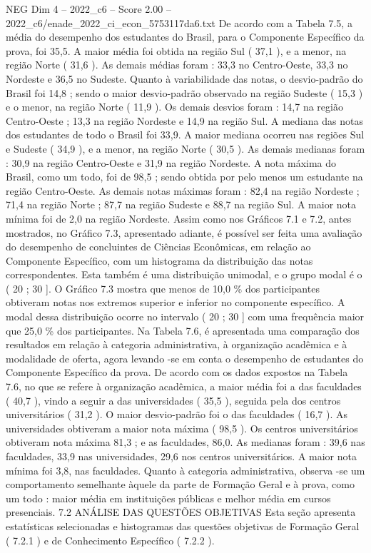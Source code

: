 \begin{textsample}{NEG Dim 4 – 2022\_c6 – Score 2.00 – 2022\_c6/enade\_2022\_ci\_econ\_5753117da6.txt}
De acordo com a Tabela 7.5, a média do desempenho dos estudantes do Brasil, para o Componente Específico da prova, foi 35,5.
A maior média foi obtida na região Sul ( 37,1 ), e a menor, na região Norte ( 31,6 ).
As demais médias foram : 33,3 no Centro-Oeste, 33,3 no Nordeste e 36,5 no Sudeste.
Quanto à variabilidade das notas, o desvio-padrão do Brasil foi 14,8 ; sendo o maior desvio-padrão observado na região Sudeste ( 15,3 ) e o menor, na região Norte ( 11,9 ).
Os demais desvios foram : 14,7 na região Centro-Oeste ; 13,3 na região Nordeste e 14,9 na região Sul.
A mediana das notas dos estudantes de todo o Brasil foi 33,9.
A maior mediana ocorreu nas regiões Sul e Sudeste ( 34,9 ), e a menor, na região Norte ( 30,5 ).
As demais medianas foram : 30,9 na região Centro-Oeste e 31,9 na região Nordeste.
A nota máxima do Brasil, como um todo, foi de 98,5 ; sendo obtida por pelo menos um estudante na região Centro-Oeste.
As demais notas máximas foram : 82,4 na região Nordeste ; 71,4 na região Norte ; 87,7 na região Sudeste e 88,7 na região Sul.
A maior nota mínima foi de 2,0 na região Nordeste.
Assim como nos Gráficos 7.1 e 7.2, antes mostrados, no Gráfico 7.3, apresentado adiante, é possível ser feita uma avaliação do desempenho de concluintes de Ciências Econômicas, em relação ao Componente Específico, com um histograma da distribuição das notas correspondentes.
Esta também é uma distribuição unimodal, e o grupo modal é o ( 20 ; 30 ].
O Gráfico 7.3 mostra que menos de 10,0 \% dos participantes obtiveram notas nos extremos superior e inferior no componente específico.
A modal dessa distribuição ocorre no intervalo ( 20 ; 30 ] com uma frequência maior que 25,0 \% dos participantes.
Na Tabela 7.6, é apresentada uma comparação dos resultados em relação à categoria administrativa, à organização acadêmica e à modalidade de oferta, agora levando -se em conta o desempenho de estudantes do Componente Específico da prova.
De acordo com os dados expostos na Tabela 7.6, no que se refere à organização acadêmica, a maior média foi a das faculdades ( 40,7 ), vindo a seguir a das universidades ( 35,5 ), seguida pela dos centros universitários ( 31,2 ).
O maior desvio-padrão foi o das faculdades ( 16,7 ).
As universidades obtiveram a maior nota máxima ( 98,5 ).
Os centros universitários obtiveram nota máxima 81,3 ; e as faculdades, 86,0.
As medianas foram : 39,6 nas faculdades, 33,9 nas universidades, 29,6 nos centros universitários.
A maior nota mínima foi 3,8, nas faculdades.
Quanto à categoria administrativa, observa -se um comportamento semelhante àquele da parte de Formação Geral e à prova, como um todo : maior média em instituições públicas e melhor média em cursos presenciais. 7.2 ANÁLISE DAS QUESTÕES OBJETIVAS Esta seção apresenta estatísticas selecionadas e histogramas das questões objetivas de Formação Geral ( 7.2.1 ) e de Conhecimento Específico ( 7.2.2 ).

\end{textsample}

